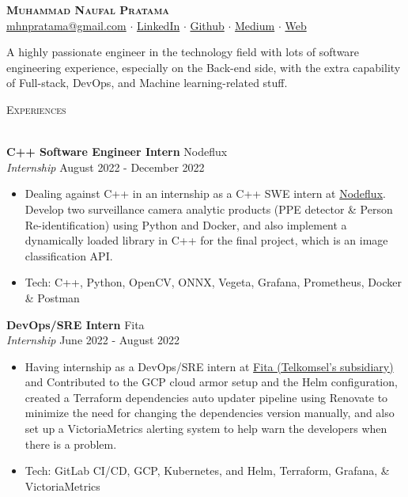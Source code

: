 \documentclass[a4paper]{article}
\newcommand{\lineunder} {
    \vspace*{-8pt} \\
    \hspace*{-18pt} \hrulefill \\
}
\newcommand{\header} [1] {
    {\hspace*{-18pt}\vspace*{6pt} \textsc{#1}}
    \vspace*{-6pt} \lineunder
}
\begin{document}
\vspace*{-40pt}

\vspace*{-10pt}
\begin{center}
	{\Huge \scshape \textbf{Muhammad Naufal Pratama}}\\
	\href{mailto:mhnpratama@gmail.com}{mhnpratama@gmail.com} $\cdot$ \href{https://linkedin.com/in/mnpratamaa}{LinkedIn} $\cdot$ \href{https://github.com/mhnaufal}{Github} $\cdot$ \href{https://medium.com/@mprtmma}{Medium} $\cdot$ \href{https://mhnaufal.github.io/}{Web}\\
\end{center}

A highly passionate engineer in the technology field with lots of software engineering experience, especially on the Back-end side, with the extra capability of Full-stack, DevOps, and Machine learning-related stuff.\\
\hfill \break

\header{Experiences}
\vspace{1mm}

\textbf{C++ Software Engineer Intern} \hfill Nodeflux\\
\textit{Internship} \hfill August 2022 - December 2022\\
\vspace{-1mm}
\begin{itemize} \itemsep 1pt
	\item Dealing against C++ in an internship as a C++ SWE intern at \href{https://www.nodeflux.io/}{Nodeflux}. Develop two surveillance camera analytic products (PPE detector \& Person Re-identification) using Python and Docker, and also implement a dynamically loaded library in C++ for the final project, which is an image classification API.
	\item Tech: C++, Python, OpenCV, ONNX, Vegeta, Grafana, Prometheus, Docker \& Postman
\end{itemize}

\textbf{DevOps/SRE Intern} \hfill Fita\\
\textit{Internship} \hfill June 2022 - August 2022\\
\vspace{-1mm}
\begin{itemize} \itemsep 1pt
	\item Having internship as a DevOps/SRE intern at \href{https://fita.co.id/}{Fita (Telkomsel's subsidiary)} and Contributed to the GCP cloud armor setup and the Helm configuration, created a Terraform dependencies auto updater pipeline using Renovate to minimize the need for changing the dependencies version manually, and also set up a VictoriaMetrics alerting system to help warn the developers when there is a problem.
	\item Tech: GitLab CI/CD, GCP, Kubernetes, and Helm, Terraform, Grafana, \& VictoriaMetrics
\end{itemize}
\end{document}
